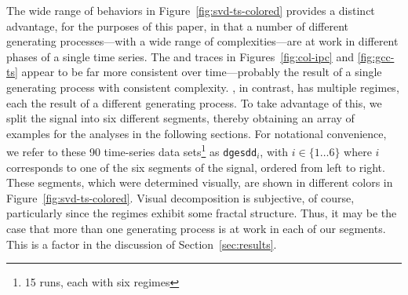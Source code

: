 The wide range of behaviors in Figure~\ref{fig:svd-ts-colored}
provides a distinct advantage, for the purposes of this paper, in that
a number of different generating processes---with a wide range of
complexities---are at work in different phases of a single time
series.  The \col and \gcc traces in Figures~\ref{fig:col-ipc} and
\ref{fig:gcc-ts} appear to be far more consistent over time---probably
the result of a single generating process with consistent complexity.
\svd, in contrast, has multiple regimes, each the result of a
different generating process.  To take advantage of this, we split the
signal into six different segments, thereby obtaining an array of
examples for the analyses in the following sections.  For notational
convenience, we refer to these 90 time-series data sets\footnote{15
  runs, each with six regimes} as {\tt dgesdd$_i$}, with $i \in
\{1\dots6\}$ where $i$ corresponds to one of the six segments of the
signal, ordered from left to right.  These segments, which were
determined visually, are shown in different colors in
Figure~\ref{fig:svd-ts-colored}.  Visual decomposition is subjective,
of course, particularly since the regimes exhibit some fractal
structure.  Thus, it may be the case that more than one generating
process is at work in each of our segments.  This is a factor in the
discussion of Section~\ref{sec:results}.

